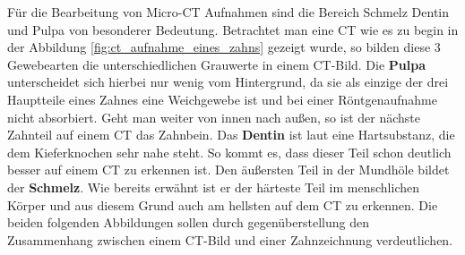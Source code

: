 Für die Bearbeitung von Micro-CT Aufnahmen sind die Bereich Schmelz Dentin und Pulpa
von besonderer Bedeutung. Betrachtet man eine CT wie es zu begin in der
Abbildung \ref{fig:ct_aufnahme_eines_zahns} gezeigt wurde, so bilden diese 3 Gewebearten
die unterschiedlichen Grauwerte in einem CT-Bild. Die \textbf{Pulpa} unterscheidet sich
hierbei nur wenig vom Hintergrund, da sie als einzige der drei Hauptteile eines Zahnes
eine Weichgewebe ist und bei einer Röntgenaufnahme nicht absorbiert. Geht man weiter von innen nach außen, so ist der nächste Zahnteil auf einem CT das Zahnbein. Das
\textbf{Dentin} ist laut \citet[Seite 41]{lehmann2012Zahnheilkunde} eine Hartsubstanz, die dem Kieferknochen sehr nahe steht. So kommt es, dass dieser Teil schon deutlich besser auf einem CT zu erkennen ist. Den äußersten Teil in der Mundhöle bildet der
\textbf{Schmelz}. Wie bereits erwähnt ist er der härteste Teil im menschlichen Körper und
aus diesem Grund auch am hellsten auf dem CT zu erkennen. Die beiden folgenden Abbildungen sollen durch gegenüberstellung den Zusammenhang zwischen einem CT-Bild und einer Zahnzeichnung verdeutlichen.

